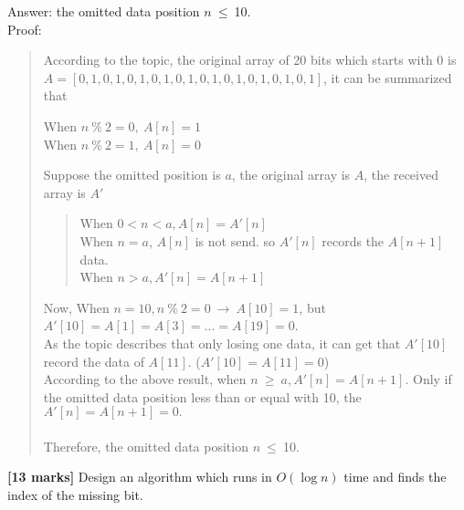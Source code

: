\documentclass{article}
\begin{document}
\begin{Question}
\begin{Subquestion}
\begin{answer}
Answer: the omitted data position $n{\ \leqslant\ }$10.\\
Proof:
\begin{quote}
According to the topic, the original array of 20 bits which starts with 0 is \\$A = [0,1,0,1,0,1,0,1,0,1,0,1,0,1,0,1,0,1,0,1]$, it can be summarized that
\begin{center} 
    When $n \ \% \ 2 = 0,\ A[n] = 1$\\
    When $n \ \% \ 2 = 1,\ A[n] = 0$\\
\end{center}
Suppose the omitted position is $a$, the original array is $A$, the received array is $A'$
\begin{quote} 
    When $0 < n < a, A[n] = A'[n]$\\
    When $n = a$, $A[n]$ is not send. so $A'[n]$ records the $A[n+1]$ data.\\
    When $n > a, A'[n] = A[n+1]$
\end{quote}
Now, When $n = 10, n \ \% \ 2 = 0 \ {\rightarrow} \ A[10] = 1$, but $A'[10] = A[1] = A[3] = ... = A[19] = 0$.\\
As the topic describes that only losing one data, it can get that $A'[10]$ record the data of $A[11]$. ($A'[10] = A[11] = 0$) \\
According to the above result, when $n{\ \geqslant\ }a, A'[n] = A[n+1]$. Only if the omitted data position less than or equal with 10, the $A'[n] = A[n+1] = 0.$\\\\
Therefore, the omitted data position $n{\ \leqslant\ }$10.\\
\end{quote}
\end{answer}
\end{Subquestion}

\clearpage
\begin{Subquestion}
\textbf{[13 marks]} Design an algorithm which runs in $O(\log n)$ time and finds the index of the missing bit.


\end{Subquestion}
\end{Question}
\end{document}
